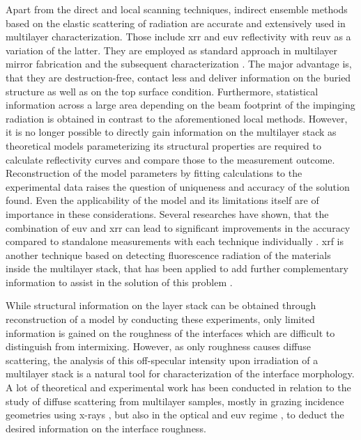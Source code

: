Apart from the direct and local scanning techniques, indirect ensemble methods based on the elastic scattering of radiation are accurate and extensively used in multilayer characterization. Those include \gls{xrr} and \gls{euv} reflectivity with \gls{reuv} as a variation of the latter. They are employed as standard approach in multilayer mirror fabrication and the subsequent characterization \cite{lim_fabrication_2001, bajt_investigation_2001, braun_mo/si_2002}. The major advantage is, that they are destruction-free, contact less and deliver information on the buried structure as well as on the top surface condition. Furthermore, statistical information across a large area depending on the beam footprint of the impinging radiation is obtained in contrast to the aforementioned local methods. However, it is no longer possible to directly gain information on the multilayer stack as theoretical models parameterizing its structural properties are required to calculate reflectivity curves and compare those to the measurement outcome. Reconstruction of the model parameters by fitting calculations to the experimental data raises the question of uniqueness and accuracy of the solution found. Even the applicability of the model and its limitations itself are of importance in these considerations. Several researches have shown, that the combination of \gls{euv} and \gls{xrr} can lead to significant improvements in the accuracy compared to standalone measurements with each technique individually \cite{yakunin_combined_2014}. \Gls{xrf} is another technique based on detecting fluorescence radiation of the materials inside the multilayer stack, that has been applied to add further complementary information to assist in the solution of this problem \cite{kortright_standing_1987, kawamura_interface_1994, ghose_x-ray_2001}.

While structural information on the layer stack can be obtained through reconstruction of a model by conducting these experiments, only limited information is gained on the roughness of the interfaces which are difficult to distinguish from intermixing. However, as only roughness causes diffuse scattering, the analysis of this off-specular intensity upon irradiation of a multilayer stack is a natural tool for characterization of the interface morphology. A lot of theoretical and experimental work has been conducted in relation to the study of diffuse scattering from multilayer samples, mostly in grazing incidence geometries using x-rays \cite{mikulik_x-ray_1997, sinha_x-ray_1994, de_boer_x-ray_1995, de_boer_x-ray_1996}, but also in the optical and \gls{euv} regime \cite{amra_light_1993, amra_light_1994, elson_light_1980, elson_relationship_1983, schroder_angle-resolved_2011, schroder_spectral_2014}, to deduct the desired information on the interface roughness.

